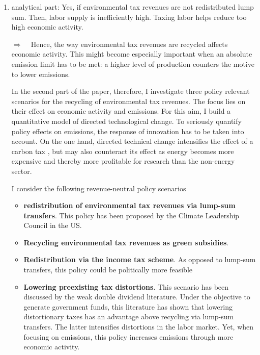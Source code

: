 \documentclass[12pt]{article}
\newcommand{\ar}{$\Rightarrow$ \ }
\begin{document}
	\begin{enumerate}
\item analytical part: Yes, if environmental tax revenues are not redistributed lump sum. Then, labor supply is inefficiently high. Taxing labor helps reduce too high economic activity. 

\item[\ar] Hence, the way environmental tax revenues are recycled affects economic activity. This might become especially important when an absolute emission limit has to be met: a higher level of production counters the motive to lower emissions. 

In the second part of the paper, therefore, I 
investigate three policy relevant scenarios for the recycling of environmental tax revenues. The focus lies on their effect on economic activity and emissions. 
For this aim, I build a quantitative model of directed technological change. To seriously quantify policy effects on emissions, the response of innovation has to be taken into account. On the one hand, directed technical change intensifies the effect of a carbon tax \cite{Fried2018ClimateAnalysis}, but may also counteract its effect as energy becomes more expensive and thereby more profitable for research than the non-energy sector.  

I consider the following revenue-neutral policy scenarios
\begin{itemize}
	\item \textbf{redistribution of environmental tax revenues via lump-sum transfers}. This policy has been proposed by the Climate  Leadership  Council  \cite{Baker2017TheDividends} in the US. %
	\item \textbf{Recycling environmental tax revenues as green subsidies}.
	\item \textbf{Redistribution via the income tax scheme}. As opposed to lump-sum transfers, this policy could be politically more feasible 
	\item \textbf{Lowering preexisting tax distortions}. This scenario has been discussed by the weak double dividend literature. Under the objective to generate government funds, this literature has shown that lowering distortionary taxes has an advantage above recycling via lump-sum transfers. The latter intensifies distortions in the labor market. Yet, when focusing on emissions, this policy increases emissions through more economic activity.
\end{itemize}


\end{enumerate}
\end{document}
